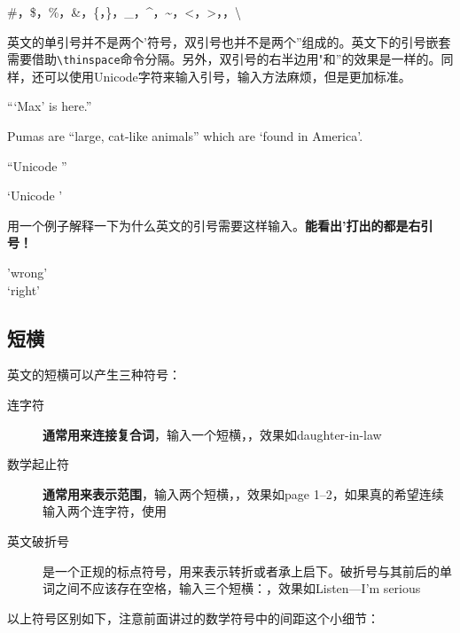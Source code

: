 {\begin{codeshow}
\#，\$，\%，\&，\{，\}，\_，\^{}，\~{}，\textless，\textgreater，\textbar，\textbackslash
\end{codeshow}


英文的单引号并不是两个'符号，双引号也并不是两个''组成的。英文下的引号嵌套需要借助\lstinline{\thinspace}命令分隔。另外，双引号的右半边用"和''的效果是一样的。同样，还可以使用Unicode字符来输入引号，输入方法麻烦，但是更加标准。

\begin{codeshow}
``\thinspace`Max' is here.''\par
Pumas are ``large, cat-like animals'' which are `found in America'.\par
\textquotedblleft Unicode \textquotedblright \par
\textquoteleft Unicode \textquoteright
\end{codeshow}

用一个例子解释一下为什么英文的引号需要这样输入。\textbf{能看出'打出的都是右引号！}


\begin{codeshow}
'wrong'\\
`right'
\end{codeshow}

\subsection*{短横}

英文的短横可以产生三种符号：

\begin{description}
    \item[连字符] \textbf{通常用来连接复合词}，输入一个短横，\code{-}，效果如daughter-in-law
    \item[数学起止符] \textbf{通常用来表示范围}，输入两个短横，\code{--}，效果如page 1--2，如果真的希望连续输入两个连字符，使用\code{{-}{-}}
    \item[英文破折号] 是一个正规的标点符号，用来表示转折或者承上启下。破折号与其前后的单词之间不应该存在空格，输入三个短横：\code{---}，效果如Listen---I'm serious
\end{description}


以上符号区别如下，注意前面讲过的数学符号中的间距这个小细节：

}
